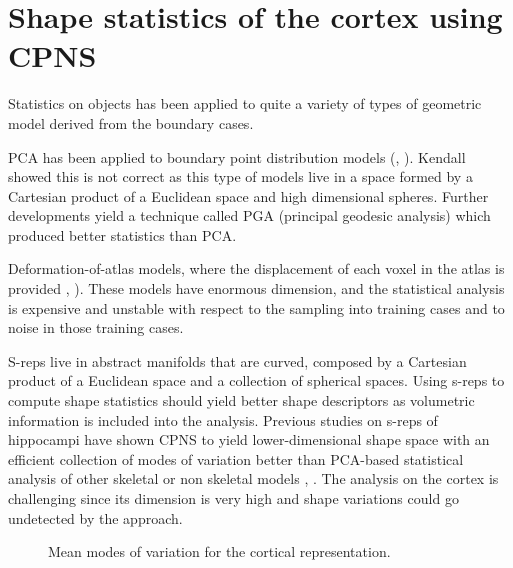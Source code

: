 \documentclass[a4paper,twoside]{article}
\begin{document}
\section{Shape statistics of the cortex using CPNS}
\label{sec:Statistics}

Statistics on objects has been applied to quite a variety of types of geometric model derived from the boundary cases. 

PCA has been applied to boundary point distribution models (\cite{cootes_training_1992}, \cite{kurtek_parameterization-invariant_2011}). Kendall \cite{kendall_shape_2009} showed this is not correct as this type of models live in a space
formed by a Cartesian product of a Euclidean space and high dimensional spheres. 
Further developments yield a technique called PGA (principal geodesic analysis) \cite{angeles_generalized_2010} which produced better statistics than PCA. 

Deformation-of-atlas models, where the displacement of each voxel in the atlas
is provided \cite{pennec_statistical_2009}, \cite{arsigny_log-euclidean_2006}). These models have enormous dimension, and the statistical analysis is expensive and unstable with respect to the sampling
into training cases and to noise in those training cases.




S-reps live in abstract manifolds that are curved,
composed by a Cartesian product of a Euclidean space and a collection of spherical spaces.
Using s-reps to compute shape statistics should yield better shape descriptors as volumetric information
is included into the analysis. 
Previous studies on s-reps of hippocampi have shown 
CPNS to yield lower-dimensional shape space with an efficient collection of modes of variation better than 
PCA-based statistical analysis of other skeletal or non skeletal models \cite{pizer_nested_2012}, \cite{schulz_2012}.
The analysis on the cortex is challenging since its dimension is very high and shape variations could go undetected
by the approach.

\begin{figure}[tb]
  \centering
  \caption[Mean modes of variation for the cortex.]{Mean modes of variation for the cortical representation.}
  \label{fig:Modes}   
\end{figure}
\end{document}
